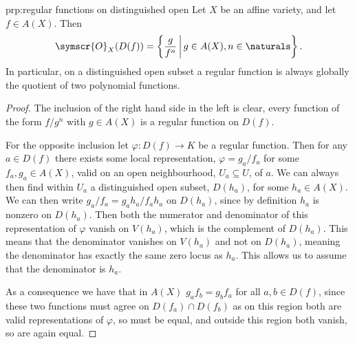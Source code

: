 \documentclass[fleqn]{NotesClass}
\newcommand{\sheaf}[1]{\symscr{#1}}
\begin{document}
    \begin{prp}{}{prp:regular functions on distinguished open}
        Let \(X\) be an affine variety, and let \(f \in A(X)\).
        Then
        \begin{equation}
            \sheaf{O}_X(D(f)) = \left\{ \frac{g}{f^n} \,\middle|\, g \in A(X), n \in \naturals \right\}.
        \end{equation}
        In particular, on a distinguished open subset a regular function is always globally the quotient of two polynomial functions.
        \begin{proof}
            The inclusion of the right hand side in the left is clear, every function of the form \(f/g^n\) with \(g \in A(X)\) is a regular function on \(D(f)\).
            
            For the opposite inclusion let \(\varphi \colon D(f) \to K\) be a regular function.
            Then for any \(a \in D(f)\) there exists some local representation, \(\varphi = g_a/f_a\) for some \(f_a, g_a \in A(X)\), valid on an open neighbourhood, \(U_a \subseteq U\), of \(a\).
            We can always then find within \(U_a\) a distinguished open subset, \(D(h_a)\), for some \(h_a \in A(X)\).
            We can then write \(g_a/f_a = g_ah_a / f_ah_a\) on \(D(h_a)\), since by definition \(h_a\) is nonzero on \(D(h_a)\).
            Then both the numerator and denominator of this representation of \(\varphi\) vanish on \(V(h_a)\), which is the complement of \(D(h_a)\).
            This means that the denominator vanishes on \(V(h_a)\) and not on \(D(h_a)\), meaning the denominator has exactly the same zero locus as \(h_a\).
            This allows us to assume that the denominator is \(h_a\).
            
            As a consequence we have that in \(A(X)\) \(g_af_b = g_bf_a\) for all \(a, b \in D(f)\), since these two functions must agree on \(D(f_a) \cap D(f_b)\) as on this region both are valid representations of \(\varphi\), so must be equal, and outside this region both vanish, so are again equal.
            

\end{proof}
\end{prp}
\end{document}
